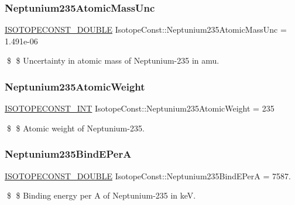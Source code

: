\subsubsection{\texorpdfstring{Neptunium235\+Atomic\+Mass\+Unc}{Neptunium235AtomicMassUnc}}
{\footnotesize\ttfamily \mbox{\hyperlink{group___isotope_const-_macros_ga8f45a7272ce02c0b4c65c44636ed719a}{I\+S\+O\+T\+O\+P\+E\+C\+O\+N\+S\+T\+\_\+\+D\+O\+U\+B\+LE}} Isotope\+Const\+::\+Neptunium235\+Atomic\+Mass\+Unc = 1.\+491e-\/06}

\$ \$ Uncertainty in atomic mass of Neptunium-\/235 in amu. \mbox{\label{group___isotope_const-_neptunium-_np235_ga40a65a961f48a5b247a89543af0b9056}} 
\subsubsection{\texorpdfstring{Neptunium235\+Atomic\+Weight}{Neptunium235AtomicWeight}}
{\footnotesize\ttfamily \mbox{\hyperlink{group___isotope_const-_macros_ga5f18360b3e99483a35c32d789e62621c}{I\+S\+O\+T\+O\+P\+E\+C\+O\+N\+S\+T\+\_\+\+I\+NT}} Isotope\+Const\+::\+Neptunium235\+Atomic\+Weight = 235}

\$ \$ Atomic weight of Neptunium-\/235. \mbox{\label{group___isotope_const-_neptunium-_np235_ga718c604b0164756cc7512619a4d72ae5}} 
\subsubsection{\texorpdfstring{Neptunium235\+Bind\+E\+PerA}{Neptunium235BindEPerA}}
{\footnotesize\ttfamily \mbox{\hyperlink{group___isotope_const-_macros_ga8f45a7272ce02c0b4c65c44636ed719a}{I\+S\+O\+T\+O\+P\+E\+C\+O\+N\+S\+T\+\_\+\+D\+O\+U\+B\+LE}} Isotope\+Const\+::\+Neptunium235\+Bind\+E\+PerA = 7587.}

\$ \$ Binding energy per A of Neptunium-\/235 in keV. \mbox{\label{group___isotope_const-_neptunium-_np235_ga99366d4392124a00dd9903b3ba34a8b6}} 
